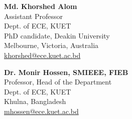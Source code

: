 \begin{minipage}[t]{0.48\linewidth}
  \textbf{Md. Khorshed Alom}\\
  Assistant Professor\\
  Dept. of ECE, KUET\\
  PhD candidate, Deakin University\\
  Melbourne, Victoria, Australia\\
  \href{mailto:khorshed@ece.kuet.ac.bd}{khorshed@ece.kuet.ac.bd}
\end{minipage}
\hfill
\begin{minipage}[t]{0.48\linewidth}
  \textbf{Dr. Monir Hossen, SMIEEE, FIEB}\\
  Professor, Head of the Department\\
  Dept. of ECE, KUET\\
  Khulna, Bangladesh\\
  \href{mailto:mhossen@ece.kuet.ac.bd}{mhossen@ece.kuet.ac.bd}
\end{minipage}

\vspace{2em}

